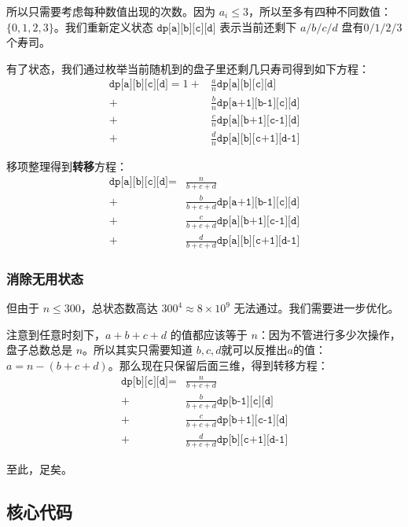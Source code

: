 所以只需要考虑每种数值出现的次数。因为 $a_i \le 3$，所以至多有四种不同数值：$\{0,1,2,3\}$。我们重新定义状态 ${\texttt{dp[a][b][c][d]}}$ 表示当前还剩下
$a/b/c/d$ 盘有$0/1/2/3$个寿司。

有了状态，我们通过枚举当前随机到的盘子里还剩几只寿司得到如下方程：
\begin{align*}
{\texttt{dp[a][b][c][d]}}
= 1
+&\frac{a}{n} {\texttt{dp[a][b][c][d]}}\\
+&\frac{b}{n} {\texttt{dp[a+1][b-1][c][d]}} \\
+&\frac{c}{n} {\texttt{dp[a][b+1][c-1][d]}} \\
+&\frac{d}{n} {\texttt{dp[a][b][c+1][d-1]}} 
\end{align*}

移项整理得到\textbf{转移}方程：
\begin{align*}
{\texttt{dp[a][b][c][d]}}
= &\frac{n}{b+c+d}\\
+&\frac{b}{b+c+d} {\texttt{dp[a+1][b-1][c][d]}} \\
+&\frac{c}{b+c+d} {\texttt{dp[a][b+1][c-1][d]}} \\
+&\frac{d}{b+c+d} {\texttt{dp[a][b][c+1][d-1]}} 
\end{align*}

\subsubsection*{消除无用状态}
但由于 $n\le 300$，总状态数高达 $300^4 \approx 8\times 10^9$ 无法通过。我们需要进一步优化。

注意到任意时刻下，$a+b+c+d$ 的值都应该等于 $n$：因为不管进行多少次操作，盘子总数总是 $n$。所以其实只需要知道 $b,c,d$就可以反推出$a$的值：$a = n-(b+c+d)$。那么现在只保留后面三维，得到转移方程：
\begin{align*}
{\texttt{dp[b][c][d]}} 
= &\frac{n}{b+c+d}\\
+&\frac{b}{b+c+d} {\texttt{dp[b-1][c][d]}} \\
+&\frac{c}{b+c+d} {\texttt{dp[b+1][c-1][d]}} \\
+&\frac{d}{b+c+d} {\texttt{dp[b][c+1][d-1]}} 
\end{align*}

至此，足矣。

\newpage
\subsection*{核心代码}
\inputminted[linenos,autogobble]{cpp}{../Code/J.cpp}
\newpage